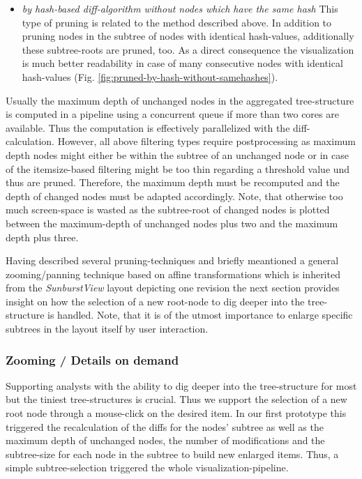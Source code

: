 \begin{itemize}

\item \emph{by hash-based diff-algorithm without nodes which have the same hash} This type of pruning is related to the method described above. In addition to pruning nodes in the subtree of nodes with identical hash-values, additionally these subtree-roots are pruned, too. As a direct consequence the visualization is much better readability in case of many consecutive nodes with identical hash-values (Fig. \ref{fig:pruned-by-hash-without-samehashes}).

\end{itemize}

Usually the maximum depth of unchanged nodes in the aggregated tree-structure is computed in a pipeline using a concurrent queue if more than two cores are available. Thus the computation is effectively parallelized with the diff-calculation. However, all above filtering types require postprocessing as maximum depth nodes might either be within the subtree of an unchanged node or in case of the itemsize-based filtering might be too thin regarding a threshold value und thus are pruned. Therefore, the maximum depth must be recomputed and the depth of changed nodes must be adapted accordingly. Note, that otherwise too much screen-space is wasted as the subtree-root of changed nodes is plotted between the maximum-depth of unchanged nodes plus two and the maximum depth plus three.

Having described several pruning-techniques and briefly meantioned a general zooming/panning technique based on affine transformations which is inherited from the \emph{SunburstView} layout depicting one revision the next section provides insight on how the selection of a new root-node to dig deeper into the tree-structure is handled. Note, that it is of the utmost importance to enlarge specific subtrees in the layout itself by user interaction. 

\subsubsection{Zooming / Details on demand} 
Supporting analysts with the ability to dig deeper into the tree-structure for most but the tiniest tree-structures is crucial. Thus we support the selection of a new root node through a mouse-click on the desired item. In our first prototype this triggered the recalculation of the diffs for the nodes' subtree as well as the maximum depth of unchanged nodes, the number of modifications and the subtree-size for each node in the subtree to build new enlarged items. Thus, a simple subtree-selection triggered the whole visualization-pipeline.

